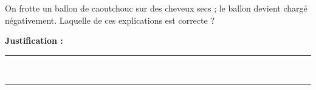 On frotte un ballon de caoutchouc sur des cheveux secs ; le ballon devient chargé négativement. Laquelle de ces explications est correcte ?

\choices

\noindent\textbf{Justification :} \hrulefill \\[2.5ex]
\rule{\linewidth}{0.4pt} \\[2.5ex]
\rule{\linewidth}{0.4pt}
\vfill
